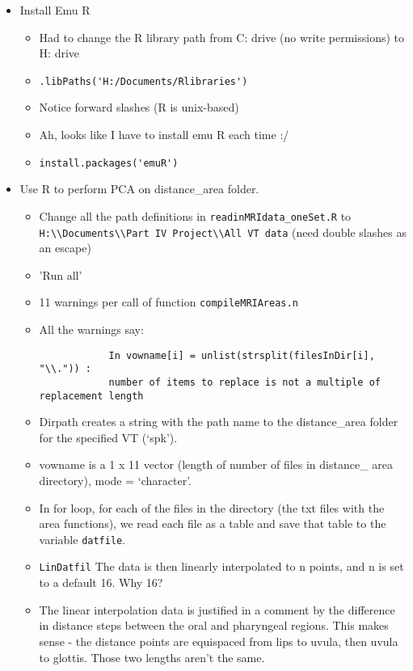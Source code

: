 \documentclass{article}
\begin{document}
\begin{itemize}
    \item Install Emu R
    \begin{itemize}
        \item Had to change the R library path from C: drive (no write permissions) to H: drive
        \item \verb|.libPaths('H:/Documents/Rlibraries')|
        \item Notice forward slashes (R is unix-based)
        \item Ah, looks like I have to install emu R each time :/
        \item \verb|install.packages('emuR')|
    \end{itemize}
    \item Use R to perform PCA on distance\_area folder.
    \begin{itemize}
        \item Change all the path definitions in \verb|readinMRIdata_oneSet.R| to \verb|H:\\Documents\\Part IV Project\\All VT data| (need double slashes as an escape)
        \item 'Run all'
        \item 11 warnings per call of function \verb|compileMRIAreas.n|
        \item All the warnings say:
        \begin{verbatim}
            In vowname[i] = unlist(strsplit(filesInDir[i], "\\.")) :
            number of items to replace is not a multiple of replacement length
        \end{verbatim}
        \item Dirpath creates a string with the path name to the distance\_area folder for the specified VT (`spk').
        \item vowname is a 1 x 11 vector (length of number of files in distance\_ area directory), mode = `character'.
        \item In for loop, for each of the files in the directory (the txt files with the area functions), we read each file as a table and save that table to the variable \verb|datfile|.
        \item \verb|LinDatfil| The data is then linearly interpolated to n points, and n is set to a default 16. Why 16?
        \item The linear interpolation data is justified in a comment by the difference in distance steps between the oral and pharyngeal regions. This makes sense - the distance points are equispaced from lips to uvula, then uvula to glottis. Those two lengths aren't the same.

\end{itemize}
\end{itemize}
\end{document}
